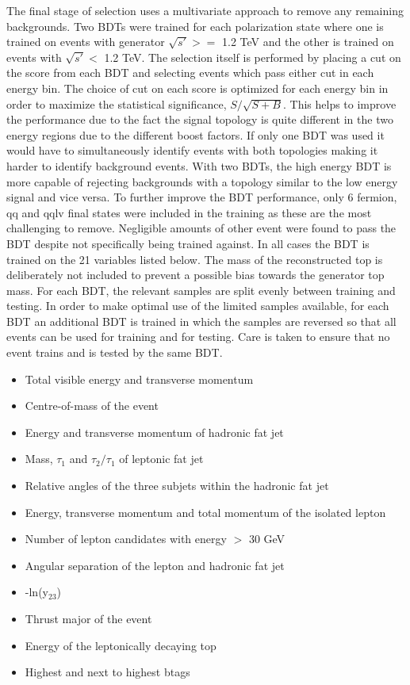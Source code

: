 The final stage of selection uses a multivariate approach to remove any remaining backgrounds. Two \ac{BDT}s were trained for each polarization state where one is trained on events with generator $\sqrt{s'} >=$ 1.2 TeV and the other is trained on events with  $\sqrt{s'} <$ 1.2 TeV. The selection itself is performed by placing a cut on the score from each \ac{BDT} and selecting events which pass either cut in each energy bin. The choice of cut on each score is optimized for each energy bin in order to maximize the statistical significance, $S/\sqrt{S+B}$. This helps to improve the performance due to the fact the signal topology is quite different in the two energy regions due to the different boost factors. If only one \ac{BDT} was used it would have to simultaneously identify events with both topologies making it harder to identify background events. With two \ac{BDT}s, the high energy \ac{BDT} is more capable of rejecting backgrounds with a topology similar to the low energy signal and vice versa. To further improve the \ac{BDT} performance, only 6 fermion, qq and qqlv final states were included in the training as these are the most challenging to remove.  Negligible amounts of other event were found to pass the \ac{BDT} despite not specifically being trained against. In all cases the BDT is trained on the 21 variables listed below. The mass of the reconstructed top is deliberately not included to prevent a possible bias towards the generator top mass. For each \ac{BDT}, the relevant samples are split evenly between training and testing. In order to make optimal use of the limited samples available, for each \ac{BDT} an additional \ac{BDT} is trained in which the samples are reversed so that all events can be used for training and for testing. Care is taken to ensure that no event trains and is tested by the same \ac{BDT}.

\begin{itemize}
\item Total visible energy and transverse momentum
\item Centre-of-mass of the event
\item Energy and transverse momentum of hadronic fat jet
\item Mass, $\tau_1$ and $\tau_2/\tau_1$ of leptonic fat jet
\item Relative angles of the three subjets within the hadronic fat jet
\item Energy, transverse momentum and total momentum of the isolated lepton
\item Number of lepton candidates with energy $>$ 30 GeV
\item Angular separation of the lepton and hadronic fat jet
\item -ln(y$_{23}$)
\item Thrust major of the event
\item Energy of the leptonically decaying top
\item Highest and next to highest btags
\end{itemize}

